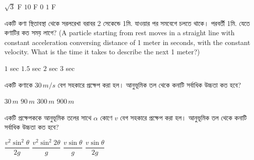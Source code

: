 \documentclass[addpoints]{exam}
\begin{document}
\begin{questions}
\begin{center}
\end{center}

\begin{oneparchoices}
\choice $ \sqrt{3} $ F
\choice $ 10 $ F
\choice $ 0 $
\choice  $ 1 $ F
\end{oneparchoices}


\question একটি কণা স্থিতাবস্থা থেকে সরলরেখা বরাবর 2 সেকেন্ডে 1মি. যাওয়ার পর সমবেগে চলতে থাকে। পরবর্তী 1মি. যেতে কণাটির কত সময় লাগে? (A particle starting from rest moves in a straight line with constant acceleration conversing distance of 1 meter in seconds, with the constant velocity. What is the time it takes to describe the next 1 meter?)

\begin{oneparchoices}
\choice  $ 1 $ sec
\choice  $ 1.5 $ sec
\choice  $ 2 $ sec
\choice  $ 3 $ sec
\end{oneparchoices}

\question একটি কণাকে $ 30\,m/s $ বেগ সহকারে প্রক্ষেপ করা হল। আনুভূমিক তল থেকে কনাটি সর্বাধিক উচ্চতা কত হবে? 

\begin{oneparchoices}
\choice $30\,m $
\choice $ 90\, m $
\choice $ 300\,m $
\choice $ 900\,m $
\end{oneparchoices}

\question একটি প্রক্ষেপককে আনুভূমিক তলের সাথে $ \alpha $ কোণে $ v $ বেগ সহকারে প্রক্ষেপ করা হল। আনুভূমিক তল থেকে কনাটি সর্বাধিক উচ্চতা কত হবে? 

\begin{oneparchoices}
\choice $\dfrac{v^{2}\sin^{2}\theta}{2g} $
\choice $\dfrac{v^{2}\sin^{2}2\theta}{g} $
\choice $\dfrac{v\sin\theta}{g} $
\choice $\dfrac{v\sin \theta}{2g} $
\end{oneparchoices}

\end{questions}
\end{document}
